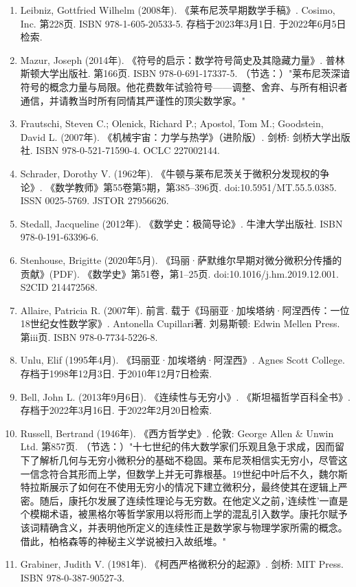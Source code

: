 \begin{enumerate}
\item Leibniz, Gottfried Wilhelm (2008年). 《莱布尼茨早期数学手稿》. Cosimo, Inc. 第228页. ISBN 978-1-605-20533-5. 存档于2023年3月1日. 于2022年6月5日检索.  
\item Mazur, Joseph (2014年). 《符号的启示：数学符号简史及其隐藏力量》. 普林斯顿大学出版社. 第166页. ISBN 978-0-691-17337-5.  
（节选：）"莱布尼茨深谙符号的概念力量与局限。他花费数年试验符号——调整、舍弃、与所有相识者通信，并请教当时所有同情其严谨性的顶尖数学家。"  
\item Frautschi, Steven C.; Olenick, Richard P.; Apostol, Tom M.; Goodstein, David L. (2007年). 《机械宇宙：力学与热学》（进阶版）. 剑桥: 剑桥大学出版社. ISBN 978-0-521-71590-4. OCLC 227002144.  
\item Schrader, Dorothy V. (1962年). 《牛顿与莱布尼茨关于微积分发现权的争论》. 《数学教师》第55卷第5期，第385–396页. doi:10.5951/MT.55.5.0385. ISSN 0025-5769. JSTOR 27956626.  
\item Stedall, Jacqueline (2012年). 《数学史：极简导论》. 牛津大学出版社. ISBN 978-0-191-63396-6.  
\item Stenhouse, Brigitte (2020年5月). 《玛丽·萨默维尔早期对微分微积分传播的贡献》(PDF). 《数学史》第51卷，第1–25页. doi:10.1016/j.hm.2019.12.001. S2CID 214472568.  
\item Allaire, Patricia R. (2007年). 前言. 载于《玛丽亚·加埃塔纳·阿涅西传：一位18世纪女性数学家》. Antonella Cupillari著. 刘易斯顿: Edwin Mellen Press. 第iii页. ISBN 978-0-7734-5226-8.  
\item Unlu, Elif (1995年4月). 《玛丽亚·加埃塔纳·阿涅西》. Agnes Scott College. 存档于1998年12月3日. 于2010年12月7日检索.  
\item Bell, John L. (2013年9月6日). 《连续性与无穷小》. 《斯坦福哲学百科全书》. 存档于2022年3月16日. 于2022年2月20日检索.  
\item Russell, Bertrand (1946年). 《西方哲学史》. 伦敦: George Allen & Unwin Ltd. 第857页.  
（节选：）"十七世纪的伟大数学家们乐观且急于求成，因而留下了解析几何与无穷小微积分的基础不稳固。莱布尼茨相信实无穷小，尽管这一信念符合其形而上学，但数学上并无可靠根基。19世纪中叶后不久，魏尔斯特拉斯展示了如何在不使用无穷小的情况下建立微积分，最终使其在逻辑上严密。随后，康托尔发展了连续性理论与无穷数。在他定义之前，'连续性'一直是个模糊术语，被黑格尔等哲学家用以将形而上学的混乱引入数学。康托尔赋予该词精确含义，并表明他所定义的连续性正是数学家与物理学家所需的概念。借此，柏格森等的神秘主义学说被扫入故纸堆。"  
\item Grabiner, Judith V. (1981年). 《柯西严格微积分的起源》. 剑桥: MIT Press. ISBN 978-0-387-90527-3.  

\end{enumerate}
